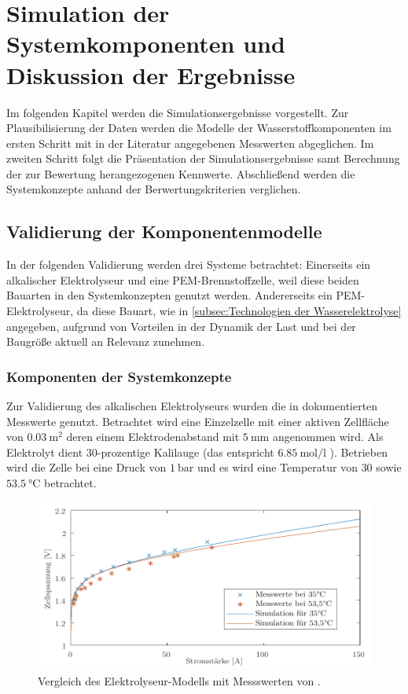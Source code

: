 \chapter{Simulation der Systemkomponenten und Diskussion der Ergebnisse}
\label{cha:Diskussion}
Im folgenden Kapitel werden die Simulationsergebnisse vorgestellt. Zur Plausibilisierung der Daten werden die Modelle der Wasserstoffkomponenten im ersten Schritt mit in der Literatur angegebenen Messwerten abgeglichen. Im zweiten Schritt folgt die Präsentation der Simulationsergebnisse samt Berechnung der zur Bewertung herangezogenen Kennwerte. Abschließend werden die Systemkonzepte anhand der Berwertungskriterien verglichen.
 
\section{Validierung der Komponentenmodelle}
\label{sec:Sektion 1}
In der folgenden Validierung werden drei Systeme betrachtet: Einerseits ein alkalischer Elektrolyseur und eine PEM-Brennstoffzelle, weil diese beiden Bauarten in den Systemkonzepten genutzt werden. Andererseits ein PEM-Elektrolyseur, da diese Bauart, wie in \ref{subsec:Technologien der Wasserelektrolyse} angegeben, aufgrund von Vorteilen in der Dynamik der Last und bei der Baugröße aktuell an Relevanz zunehmen. 

\subsection{Komponenten der Systemkonzepte}
Zur Validierung des alkalischen Elektrolyseurs wurden die in \citet{hammoudi_new_2012} dokumentierten Messwerte genutzt. Betrachtet wird eine Einzelzelle mit einer aktiven Zellfläche von $\SI{0,03}{\m\squared}$ deren einem Elektrodenabstand mit $\SI{5}{\milli\m}$ angenommen wird. Als Elektrolyt dient $30$-prozentige Kalilauge (das entspricht $\SI{6,85}{\mol\per\l}$ \citep{periodensystem-online_dichtewerttabelle_nodate}). Betrieben wird die Zelle bei eine Druck von $\SI{1}{\bar}$ und es wird eine Temperatur von $30$ sowie $\SI{53,5}{\degreeCelsius}$ betrachtet.

\begin{figure}[h]
	\centering
		\includegraphics[scale=1]{Figures/ValidierungALK}
		\caption{Vergleich des Elektrolyseur-Modells mit Messswerten von \citet{hammoudi_new_2012}.}
\label{fig:ValALK}	
\end{figure}

